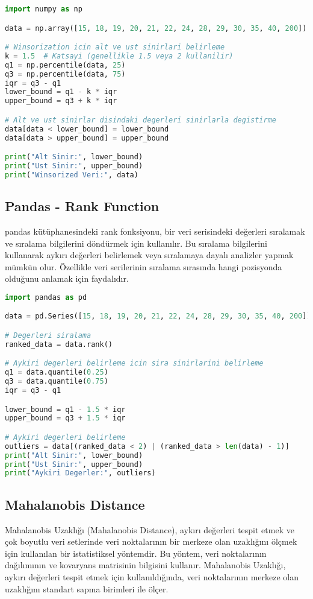 \begin{lstlisting}[language=Python]
import numpy as np

data = np.array([15, 18, 19, 20, 21, 22, 24, 28, 29, 30, 35, 40, 200])

# Winsorization icin alt ve ust sinirlari belirleme
k = 1.5  # Katsayi (genellikle 1.5 veya 2 kullanilir)
q1 = np.percentile(data, 25)
q3 = np.percentile(data, 75)
iqr = q3 - q1
lower_bound = q1 - k * iqr
upper_bound = q3 + k * iqr

# Alt ve ust sinirlar disindaki degerleri sinirlarla degistirme
data[data < lower_bound] = lower_bound
data[data > upper_bound] = upper_bound

print("Alt Sinir:", lower_bound)
print("Ust Sinir:", upper_bound)
print("Winsorized Veri:", data)
\end{lstlisting}

\subsection{Pandas - Rank Function}
pandas kütüphanesindeki rank fonksiyonu, bir veri serisindeki değerleri sıralamak ve sıralama bilgilerini döndürmek için kullanılır. Bu sıralama bilgilerini kullanarak aykırı değerleri belirlemek veya sıralamaya dayalı analizler yapmak mümkün olur. Özellikle veri serilerinin sıralama sırasında hangi pozisyonda olduğunu anlamak için faydalıdır.

\begin{lstlisting}[language=Python]
import pandas as pd

data = pd.Series([15, 18, 19, 20, 21, 22, 24, 28, 29, 30, 35, 40, 200])

# Degerleri siralama
ranked_data = data.rank()

# Aykiri degerleri belirleme icin sira sinirlarini belirleme
q1 = data.quantile(0.25)
q3 = data.quantile(0.75)
iqr = q3 - q1

lower_bound = q1 - 1.5 * iqr
upper_bound = q3 + 1.5 * iqr

# Aykiri degerleri belirleme
outliers = data[(ranked_data < 2) | (ranked_data > len(data) - 1)]
print("Alt Sinir:", lower_bound)
print("Ust Sinir:", upper_bound)
print("Aykiri Degerler:", outliers)
\end{lstlisting}

\subsection{Mahalanobis Distance}
Mahalanobis Uzaklığı (Mahalanobis Distance), aykırı değerleri tespit etmek ve çok boyutlu veri setlerinde veri noktalarının bir merkeze olan uzaklığını ölçmek için kullanılan bir istatistiksel yöntemdir. Bu yöntem, veri noktalarının dağılımının ve kovaryans matrisinin bilgisini kullanır. Mahalanobis Uzaklığı, aykırı değerleri tespit etmek için kullanıldığında, veri noktalarının merkeze olan uzaklığını standart sapma birimleri ile ölçer.

